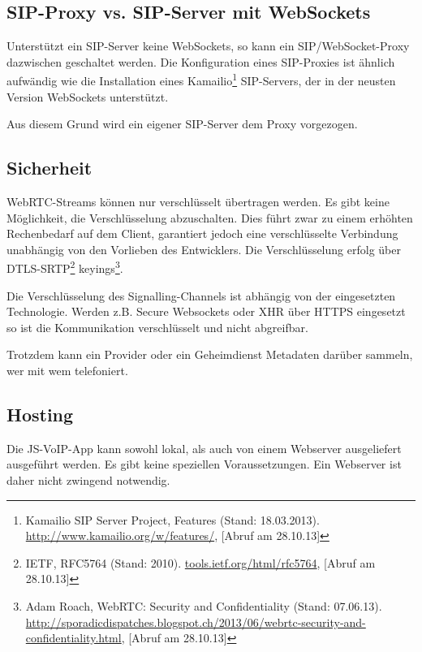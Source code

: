 	\subsection{SIP-Proxy vs. SIP-Server mit WebSockets}
		Unterstützt ein SIP-Server keine WebSockets, so kann ein SIP/WebSocket-Proxy
		dazwischen geschaltet werden. Die Konfiguration eines SIP-Proxies ist ähnlich
		aufwändig wie die Installation eines Kamailio\footnote{Kamailio SIP Server
		Project, Features (Stand: 18.03.2013). \hyperlink{http://www.kamailio.org/w/features/}{http://www.kamailio.org/w/features/}, [Abruf am 28.10.13]} SIP-Servers, der in der neusten Version WebSockets unterstützt.

		Aus diesem Grund wird ein eigener SIP-Server dem Proxy vorgezogen.

	\subsection{Sicherheit}
		WebRTC-Streams können nur verschlüsselt übertragen werden. Es gibt keine
		Möglichkeit, die Verschlüsselung abzuschalten. Dies führt zwar zu einem
		erhöhten Rechenbedarf auf dem Client, garantiert jedoch eine verschlüsselte
		Verbindung unabhängig von den Vorlieben des Entwicklers.
		Die Verschlüsselung erfolg über DTLS-SRTP\footnote{IETF, RFC5764 (Stand: 2010). \hyperlink{http://tools.ietf.org/html/rfc5764}{tools.ietf.org/html/rfc5764}, [Abruf am 28.10.13]} keyings\footnote{Adam Roach, WebRTC: Security and Confidentiality (Stand: 07.06.13). \hyperlink{http://sporadicdispatches.blogspot.ch/2013/06/webrtc-security-and-confidentiality.html}{http://sporadicdispatches.blogspot.ch/2013/06/webrtc-security-and-confidentiality.html}, [Abruf am 28.10.13]}. 
		
		Die Verschlüsselung des Signalling-Channels ist abhängig von der eingesetzten
		Technologie. Werden z.B. Secure Websockets oder XHR über HTTPS eingesetzt so ist die Kommunikation verschlüsselt und nicht abgreifbar.
		
		Trotzdem kann ein Provider oder ein Geheimdienst Metadaten darüber sammeln, wer mit wem telefoniert.
		  
	\subsection{Hosting}
		Die JS-VoIP-App kann sowohl lokal, als auch von einem
		Webserver ausgeliefert ausgeführt werden. Es gibt keine speziellen Voraussetzungen. Ein Webserver ist daher nicht zwingend notwendig.
		

